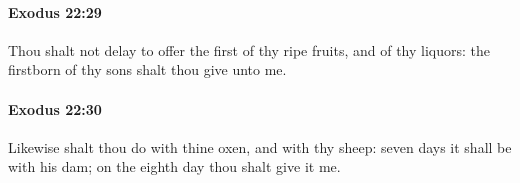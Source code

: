 		\paragraph{Exodus 22:29} %
			\label{EXODUS-22-29}

			Thou shalt not delay to offer the first of thy ripe fruits, and of thy liquors: the firstborn of thy sons shalt thou give unto me.


		\paragraph{Exodus 22:30} %
			\label{EXODUS-22-30}

			Likewise shalt thou do with thine oxen, and with thy sheep: seven days it shall be with his dam; on the eighth day thou shalt give it me.


